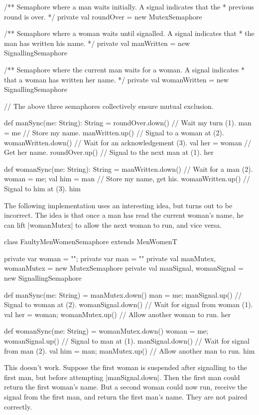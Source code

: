 \begin{answerI}
\begin{scala}
{  /** Semaphore where a man waits initially.  A signal indicates that the
    * previous round is over. */
  private val roundOver = new MutexSemaphore

  /** Semaphore where a woman waits until signalled.  A signal indicates that
    * the man has written his name. */
  private val manWritten = new SignallingSemaphore

  /** Semaphore where the current man waits for a woman.  A signal indicates
    * that a woman has written her name. */
  private val womanWritten = new SignallingSemaphore

  // The above three semaphores collectively ensure mutual exclusion.

  def manSync(me: String): String = {
    roundOver.down()    // Wait my turn (1).
    man = me            // Store my name.
    manWritten.up()     // Signal to a woman at (2).
    womanWritten.down() // Wait for an acknowledgement (3).
    val her = woman     // Get her name.
    roundOver.up()      // Signal to the next man at (1).
    her
  }

  def womanSync(me: String): String = {
    manWritten.down()         // Wait for a man (2).
    woman = me; val him = man // Store my name, get his.
    womanWritten.up()         // Signal to him at (3).
    him
  }
}
\end{scala}

The following implementation uses an interesting idea, but turns out to be
incorrect.  The idea is that once a man has read the current woman's name, he
can lift |womanMutex| to allow the next woman to run, and vice versa.
%
\begin{scala}
class FaultyMenWomenSemaphore extends MenWomenT{
  private var woman = ""; private var man = ""
  private val manMutex, womanMutex = new MutexSemaphore
  private val manSignal, womanSignal = new SignallingSemaphore

  def manSync(me: String) = {
    manMutex.down()
    man = me; manSignal.up() // Signal to woman at (2).
    womanSignal.down() // Wait for signal from woman (1).
    val her = woman; womanMutex.up() // Allow another woman to run.
    her
  }

  def womanSync(me: String) = {
    womanMutex.down()
    woman = me; womanSignal.up() // Signal to man at (1).
    manSignal.down() // Wait for signal from man (2).
    val him = man; manMutex.up() // Allow another man to run.
    him
  }
}
\end{scala}
%
This doesn't work.  Suppose the first woman is suspended after signalling to
the first man, but before attempting |manSignal.down|.  Then the first man
could return the first woman's name.  But a second woman could now run,
receive the signal from the first man, and return the first man's name.  They
are not paired correctly. 
\end{answerI}
